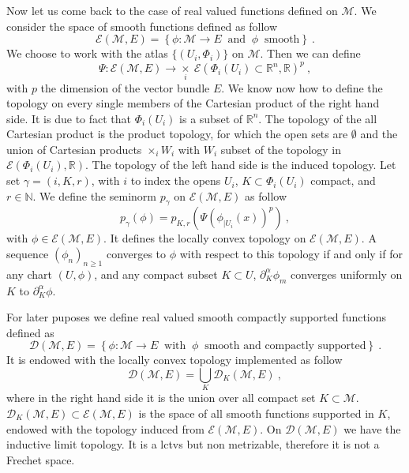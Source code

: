 \documentclass[10pt]{book}
\newcommand{\Dcal}{\mathcal{D}}
\newcommand{\Ecal}{\mathcal{E}}
\newcommand{\Mcal}{\mathcal{M}}
\newcommand{\Nbb}{\mathbb{N}}
\newcommand{\Rbb}{\mathbb{R}}
\theoremstyle{break}
\begin{document}
Now let us come back to the case of real valued functions defined on $\Mcal$. We consider the space of smooth functions defined as follow
%
\begin{equation*}
\Ecal(\Mcal,E) = \left\{ \phi : \Mcal \to E \ \mbox{ and } \ \phi \ \mbox{ smooth} \right\} \ .
\end{equation*}
%
We choose to work with the atlas $\{(U_i,\Phi_i)\}$ on $\Mcal$. Then we can define
%
\begin{equation*}
\Psi : \Ecal(\Mcal,E) \to \underset{i}{\times} \ \Ecal\left(\Phi_i(U_i) \subset \Rbb^n , \Rbb \right)^p \ ,
\end{equation*}
%
with $p$ the dimension of the vector bundle $E$. We know now how to define the topology on every single members of the Cartesian product of the right hand side. It is due to fact that $\Phi_i(U_i)$ is a subset of $\Rbb^n$. The topology of the all Cartesian product is the product topology, for which the open sets are $\emptyset$ and the union of Cartesian products $\times_i W_i$ with $W_i$ subset of the topology in $ \Ecal\left(\Phi_i(U_i) , \Rbb \right)$. The topology of the left hand side is the induced topology. Let set $\gamma = (i, K, r)$, with $i$ to index the opens $U_i$, $K \subset \Phi_i(U_i)$ compact, and $r \in \Nbb$. We define the seminorm $p_\gamma$ on $\Ecal(\Mcal,E)$ as follow
%
\begin{equation*}
p_\gamma(\phi) = p_{K,r}\left( \Psi\left( \phi_{|U_i}(x) \right)^p \right) \ ,
\end{equation*}
%
with $\phi \in \Ecal\left(\Mcal , E \right)$. It defines the locally convex topology on $\Ecal\left(\Mcal , E \right)$. A sequence $(\phi_n)_{n\geq 1}$ converges to $\phi$ with respect to this topology if and only if for any chart $(U,\phi)$, and any compact subset $K \subset U$, $\partial^\alpha_K \phi_m$ converges uniformly on $K$ to $\partial^\alpha_K \phi$.


\bigskip


For later puposes we define real valued smooth compactly supported functions defined as
%
\begin{equation*}
\Dcal(\Mcal,E) = \left\{ \phi : \Mcal \to E \ \mbox{ with } \ \phi \ \mbox{ smooth and compactly supported} \right\} \ .
\end{equation*}
%
It is endowed with the locally convex topology implemented as follow
%
\begin{equation*}
\Dcal(\Mcal,E) = \bigcup_{K} \Dcal_K(\Mcal,E) \ ,
\end{equation*}
%
where in the right hand side it is the union over all compact set $K \subset \Mcal$. $\Dcal_K(\Mcal,E) \subset \Ecal(\Mcal,E)$ is the space of all smooth functions supported in $K$, endowed with the topology induced from $\Ecal(\Mcal,E)$. On $\Dcal(\Mcal,E)$ we have the inductive limit topology. It is a lctvs but non metrizable, therefore it is not a Frechet space. 
\end{document}
